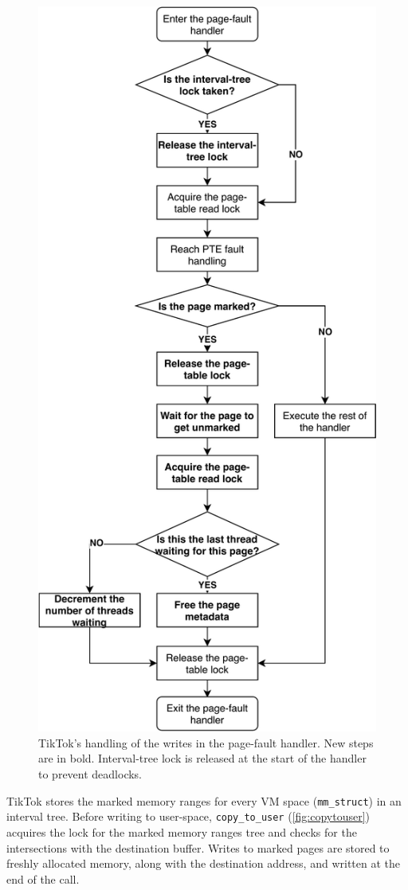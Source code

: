 \documentclass[conference]{IEEEtran}
\newcommand{\sysname}{TikTok}
\begin{document}
\begin{figure}[]
  \centering
  \includegraphics[width = 0.8\linewidth]{img/pagefault.pdf}
  \caption{\sysname's handling of the writes in the page-fault handler. New steps are in bold. Interval-tree lock
  is released at the start of the handler to prevent deadlocks.
}
  \label{fig:pagefault}
\end{figure}

\sysname{} stores the marked memory ranges for every VM space
(\texttt{mm\_struct}) in an interval tree. Before writing to user-space,
\texttt{copy\_to\_user} (\autoref{fig:copytouser}) acquires the lock for the
marked memory ranges tree and checks for the intersections with the destination
buffer.  Writes to marked pages are stored to freshly allocated memory, along
with the destination address, and written at the end of the call.
\end{document}
